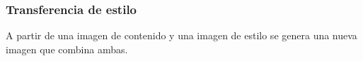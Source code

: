 \documentclass[10pt,center]{beamer}
\begin{document}
\begin{frame}
  \frametitle{Transferencia de estilo}
  A partir de una imagen de contenido y una imagen de estilo se genera una nueva imagen que combina ambas.
  \begin{figure}[h]
  \captionsetup[subfigure]{labelformat=empty}
    \begin{center}
       \hspace{1.0cm}
       \hspace{1.0cm}

\end{center}
\end{figure}
\end{frame}
\end{document}
